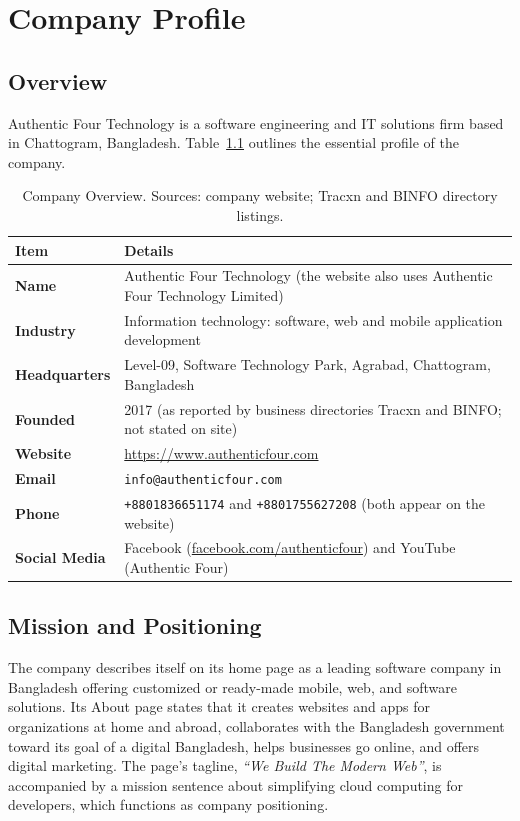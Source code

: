 \documentclass[11pt,a4paper,oneside]{report}
\begin{document}
\chapter{Company Profile}

\section{Overview}
Authentic Four Technology is a software engineering and IT solutions firm based in Chattogram, Bangladesh. Table~\ref{tab:company_overview} outlines the essential profile of the company.

\begin{table}[H]
\centering
\small
\begin{tabularx}{\textwidth}{lX}
\toprule
\textbf{Item} & \textbf{Details} \\
\midrule
\textbf{Name} & Authentic Four Technology (the website also uses Authentic Four Technology Limited) \\
\textbf{Industry} & Information technology: software, web and mobile application development \\
\textbf{Headquarters} & Level-09, Software Technology Park, Agrabad, Chattogram, Bangladesh \\
\textbf{Founded} & 2017 (as reported by business directories Tracxn and BINFO; not stated on site) \\
\textbf{Website} & \url{https://www.authenticfour.com} \\
\textbf{Email} & \texttt{info@authenticfour.com} \\
\textbf{Phone} & \texttt{+8801836651174} and \texttt{+8801755627208} (both appear on the website) \\
\textbf{Social Media} & Facebook (\url{facebook.com/authenticfour}) and YouTube (Authentic Four) \\
\bottomrule
\end{tabularx}
\caption{Company Overview. Sources: company website; Tracxn and BINFO directory listings.}
\label{tab:company_overview}
\end{table}

\section{Mission and Positioning}
The company describes itself on its home page as a leading software company in Bangladesh offering customized or ready-made mobile, web, and software solutions. Its About page states that it creates websites and apps for organizations at home and abroad, collaborates with the Bangladesh government toward its goal of a digital Bangladesh, helps businesses go online, and offers digital marketing. The page's tagline, \emph{``We Build The Modern Web''}, is accompanied by a mission sentence about simplifying cloud computing for developers, which functions as company positioning.
\end{document}
